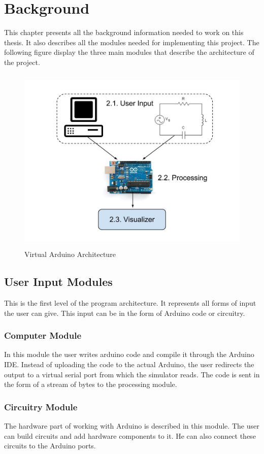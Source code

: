 \chapter{Background}\label{chap:background}

This chapter presents all the background information needed to work on this thesis. It also describes all the modules needed for implementing this project. The following figure 
display the three main modules that describe the architecture of the project.

\begin{figure}[h!]
\centering
\includegraphics[height=9cm, width=12cm]{Architecture.jpg}
\caption{Virtual Arduino Architecture}
\label{Architecture}
\end{figure}

\section{User Input Modules}
This is the first level of the program architecture. It represents all forms of input the user can give. This input can be in the form of Arduino code or circuitry.

\subsection{Computer Module}
In this module the user writes arduino code and compile it through the Arduino IDE. Instead of uploading the code to the actual Arduino, the user redirects the output to a virtual serial port from which the simulator reads. The code is sent in the form of a stream of bytes to the processing module. 

\subsection{Circuitry Module}
The hardware part of working with Arduino is described in this module. The user can build circuits and add hardware components to it. He can also connect these circuits to the Arduino ports.

